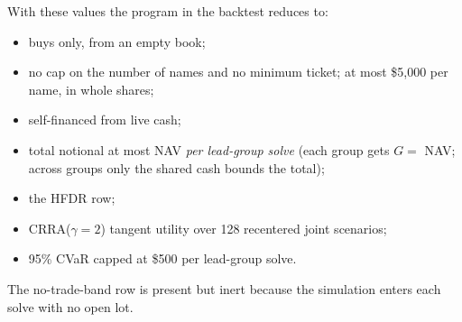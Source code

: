 \documentclass[11pt]{article}
\begin{document}
\noindent With these values the program in the backtest reduces to:
\begin{itemize}
\item buys only, from an empty book;
\item no cap on the number of names and no minimum ticket; at most
  \$5,000 per name, in whole shares;
\item self-financed from live cash;
\item total notional at most NAV \emph{per lead-group solve} (each group gets
  $G=$ NAV; across groups only the shared cash bounds the total);
\item the HFDR row;
\item CRRA($\gamma=2$) tangent utility over 128 recentered joint scenarios;
\item 95\% CVaR capped at \$500 per lead-group solve.
\end{itemize}
The no-trade-band row is present but inert because the simulation enters each
solve with no open lot.

\end{document}
